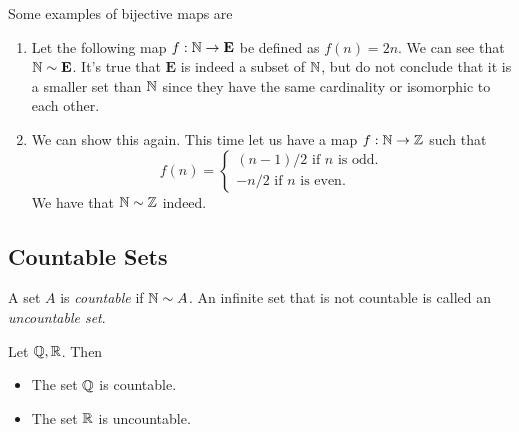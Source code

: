 Some examples of bijective maps are
\begin{example}{}{}
\begin{enumerate}
    \item Let the following map \(f: \mathbb{N} \to \mathbf{E} \) be defined as \( f(n) = 2n \). We can see that \( \mathbb{N} \sim \mathbf{E}\). It's true that \( \mathbf{E}\) is indeed a subset of \( \mathbb{N} \), but do not conclude that it is a smaller set than \( \mathbb{N} \) since they have the same cardinality or isomorphic to each other.
    \item We can show this again. This time let us have a map \( f: \mathbb{N} \to \mathbb{Z} \) such that 
        \[ f(n) = \begin{cases}  (n-1)/2 \text{ if } n \text{ is odd.}       \\
                                 -n/2 \text{ if } n \text{ is even.}
                                                \end{cases}\]
We have that \( \mathbb{N} \sim \mathbb{Z} \) indeed.
\end{enumerate}
\end{example}


\subsection{Countable Sets}

\begin{definition}{}{}
A set \( A \) is \textit{countable} if \( \mathbb{N} \sim A \). An infinite set that is not countable is called an \textit{uncountable set}.
\end{definition}

\begin{theorem}{}{}
Let \( \mathbb{Q}, \mathbb{R} \). Then 
\begin{itemize}
    \item The set \( \mathbb{Q} \) is countable. 
    \item The set \( \mathbb{R} \) is uncountable.
\end{itemize}


\end{theorem} 


